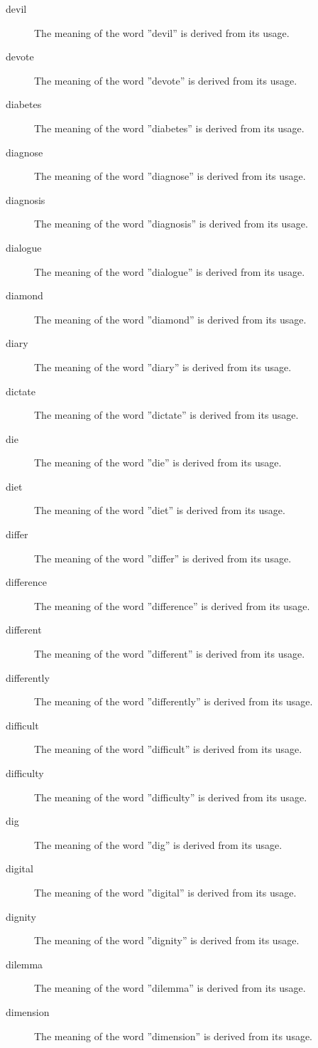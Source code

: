 \documentclass[12pt, letterpaper]{memoir}
\begin{document}
\begin{description}
\item[devil] The meaning of the word ''devil'' is derived from its usage.
\item[devote] The meaning of the word ''devote'' is derived from its usage.
\item[diabetes] The meaning of the word ''diabetes'' is derived from its usage.
\item[diagnose] The meaning of the word ''diagnose'' is derived from its usage.
\item[diagnosis] The meaning of the word ''diagnosis'' is derived from its usage.
\item[dialogue] The meaning of the word ''dialogue'' is derived from its usage.
\item[diamond] The meaning of the word ''diamond'' is derived from its usage.
\item[diary] The meaning of the word ''diary'' is derived from its usage.
\item[dictate] The meaning of the word ''dictate'' is derived from its usage.
\item[die] The meaning of the word ''die'' is derived from its usage.
\item[diet] The meaning of the word ''diet'' is derived from its usage.
\item[differ] The meaning of the word ''differ'' is derived from its usage.
\item[difference] The meaning of the word ''difference'' is derived from its usage.
\item[different] The meaning of the word ''different'' is derived from its usage.
\item[differently] The meaning of the word ''differently'' is derived from its usage.
\item[difficult] The meaning of the word ''difficult'' is derived from its usage.
\item[difficulty] The meaning of the word ''difficulty'' is derived from its usage.
\item[dig] The meaning of the word ''dig'' is derived from its usage.
\item[digital] The meaning of the word ''digital'' is derived from its usage.
\item[dignity] The meaning of the word ''dignity'' is derived from its usage.
\item[dilemma] The meaning of the word ''dilemma'' is derived from its usage.
\item[dimension] The meaning of the word ''dimension'' is derived from its usage.

\end{description}
\end{document}
